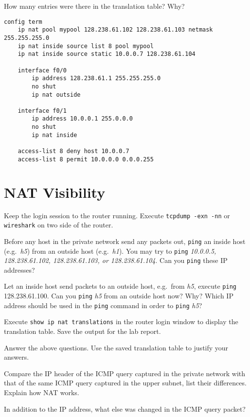 \documentclass{../UTNetLab}
\begin{document}
    \begin{report}
        \item How many entries were there in the translation table? Why?
    \end{report}
    
    \begin{lstlisting}[language={cisco}, emph={mypool}, caption={NAT Router Configuration in \hyperref[fig:8.7]{Figure~8.7} (Table~8.5)\label{tab:8.5}}]
config term
    ip nat pool mypool 128.238.61.102 128.238.61.103 netmask 255.255.255.0
    ip nat inside source list 8 pool mypool
    ip nat inside source static 10.0.0.7 128.238.61.104

    interface f0/0
        ip address 128.238.61.1 255.255.255.0
        no shut
        ip nat outside

    interface f0/1
        ip address 10.0.0.1 255.0.0.0
        no shut
        ip nat inside

    access-list 8 deny host 10.0.0.7
    access-list 8 permit 10.0.0.0 0.0.0.255
    \end{lstlisting}

\section{NAT Visibility}
    Keep the login session to the router running.
    Execute \lstinline{tcpdump -exn -nn} or \lstinline{wireshark} on two side of the router.

    Before any host in the private network send any packets out, \lstinline{ping} an inside host (e.g.\ \textit{h5}) from an outside host (e.g.\ \textit{h1}).
    You may try to \lstinline{ping} \textit{10.0.0.5, 128.238.61.102, 128.238.61.103, or 128.238.61.104}.
    Can you \lstinline{ping} these IP addresses? 

    Let an inside host send packets to an outside host, e.g.\ from \textit{h5}, execute \lstinline{ping} 128.238.61.100.
    Can you \lstinline{ping} \textit{h5} from an outside host now? Why? Which IP address should be used in the \lstinline{ping} command in order to \lstinline{ping} \textit{h5}? 

    Execute \lstinline[language=cisco]{show ip nat translations} in the router login window to display the translation table.
    Save the output for the lab report.

    \begin{report}
        \item Answer the above questions.
            Use the saved translation table to justify your answers.
        
        \item Compare the IP header of the ICMP query captured in the private network with that of the same ICMP query captured in the upper subnet, list their differences.
            Explain how NAT works.
        
        \item In addition to the IP address, what else was changed in the ICMP query packet?
    \end{report}
\end{document}
